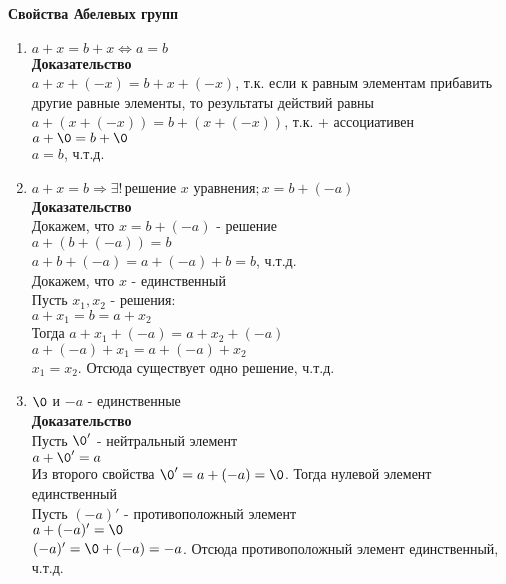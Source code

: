 \documentclass[12pt]{article}
\begin{document}
\textbf{Свойства Абелевых групп}
\begin{enumerate}
    \item $a+x=b+x \Leftrightarrow a=b$\\
    \textbf{Доказательство}\\
    $a+x+(-x)=b+x+(-x)$, т.к. если к равным элементам прибавить другие равные элементы, то результаты действий равны\\
    $a+(x+(-x))=b+(x+(-x))$, т.к. + ассоциативен\\
    $a+\0=b+\0$\\
    $a=b$, ч.т.д.
    \item $a+x=b\Rightarrow \exists!\,\text{решение } x \text{ уравнения}; x=b+(-a)$\\
    \textbf{Доказательство}\\
    Докажем, что $x=b+(-a)$ - решение\\
    $a+(b+(-a))=b$\\
    $a+b+(-a)=a+(-a)+b=b$, ч.т.д.\\
    Докажем, что $x$ - единственный\\
    Пусть $x_1, x_2$ - решения:\\
    $a+x_1=b=a+x_2$\\
    Тогда $a+x_1+(-a)=a+x_2+(-a)$\\
    $a+(-a)+x_1=a+(-a)+x_2$\\
    $x_1=x_2$. Отсюда существует одно решение, ч.т.д.
    \item $\0$ и $-a$ - единственные\\
    \textbf{Доказательство}\\
    Пусть $\0'$ - нейтральный элемент\\
    $a+\0'=a$\\
    Из второго свойства $\0'=a+(-a)=\0$. Тогда нулевой элемент единственный\\
    Пусть $(-a)'$ - противоположный элемент\\
    $a+(-a)'=\0$\\
    $(-a)'=\0+(-a)=-a$. Отсюда противоположный элемент единственный, ч.т.д.
\end{enumerate}
\end{document}
